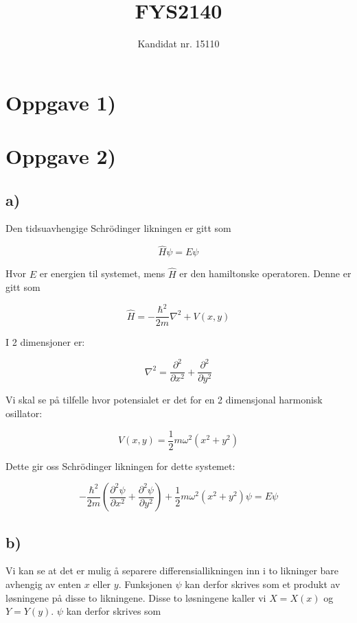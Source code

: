 \documentclass[a4paper,norsk, 10pt]{article}
\title{FYS2140}
\author{Kandidat nr. 15110}
\numberwithin{equation}{section}
\begin{document}
\maketitle

\section{Oppgave 1)}

\section{Oppgave 2)}

\subsection*{a)}

Den tidsuavhengige Schrödinger likningen er gitt som 

\begin{equation}
\hat{H}\psi = E\psi
\label{eq:TUSL}
\end{equation}

Hvor $E$ er energien til systemet, mens $\hat{H}$ er den hamiltonske operatoren. Denne er gitt som

$$
\hat{H} = -\frac{\hbar^2}{2m}\nabla^2  + V(x,y)
$$

I 2 dimensjoner er:

$$
\nabla^2 = \frac{\partial^2}{\partial x^2} + \frac{\partial^2}{\partial y^2}
$$

Vi skal se på tilfelle hvor potensialet er det for en 2 dimensjonal harmonisk osillator:

$$
V(x,y) = \frac{1}{2}m\omega^2(x^2 + y^2)
$$

Dette gir oss Schrödinger likningen for dette systemet:

\begin{equation}
-\frac{\hbar^2}{2m}\left(\frac{\partial^2 \psi}{\partial x^2} + \frac{\partial^2 \psi}{\partial y^2}\right) + \frac{1}{2}m\omega^2(x^2 + y^2)\psi = E\psi
\label{eq:2dSch}
\end{equation}

\subsection*{b)}

Vi kan se at det er mulig å separere differensiallikningen inn i to likninger bare avhengig av enten $x$ eller $y$. Funksjonen $\psi$ kan derfor skrives som et produkt av løsningene på disse to likningene. Disse to løsningene kaller vi $X = X(x)$ og $Y = Y(y)$. $\psi$ kan derfor skrives som
\end{document}
